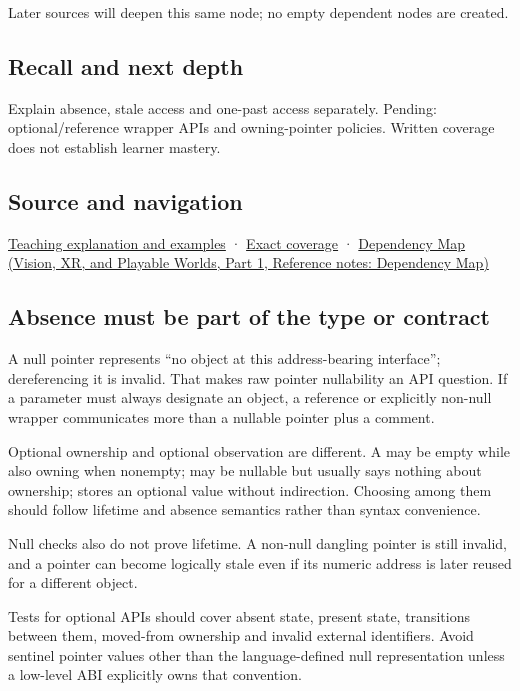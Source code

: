 Later sources will deepen this same node; no empty dependent nodes are created.

\subsection{Recall and next depth}\label{appendix-afae48c31800-recall-and-next-depth}

\hypertarget{appendix-afae48c31800-recall-and-next-depth}{}

Explain absence, stale access and one-past access separately. Pending: optional/reference wrapper APIs and owning-pointer policies. Written coverage does not establish learner mastery.

\subsection{Source and navigation}\label{appendix-afae48c31800-source-and-navigation}

\hypertarget{appendix-afae48c31800-source-and-navigation}{}

\hyperref[01-foundations-i-ch003-a-pointer-carries-an-access-contract]{Teaching explanation and examples} · \hyperref[appendix-fd090d982a15-m008---parts-113-126]{Exact coverage} · \href{../07-Vision-XR-and-Playable-Worlds-P01/main.pdf\#nameddest=appendix-4ad47bdd269a}{Dependency Map (Vision, XR, and Playable Worlds, Part 1, Reference notes: Dependency Map)}

\subsection{Absence must be part of the type or contract}\label{appendix-afae48c31800-absence-must-be-part-of-the-type-or-contract}

\hypertarget{appendix-afae48c31800-absence-must-be-part-of-the-type-or-contract}{}

A null pointer represents ``no object at this address-bearing interface''; dereferencing it is invalid. That makes raw pointer nullability an API question. If a parameter must always designate an object, a reference or explicitly non-null wrapper communicates more than a nullable pointer plus a comment.

Optional ownership and optional observation are different. A  may be empty while also owning when nonempty;  may be nullable but usually says nothing about ownership;  stores an optional value without indirection. Choosing among them should follow lifetime and absence semantics rather than syntax convenience.

Null checks also do not prove lifetime. A non-null dangling pointer is still invalid, and a pointer can become logically stale even if its numeric address is later reused for a different object.

Tests for optional APIs should cover absent state, present state, transitions between them, moved-from ownership and invalid external identifiers. Avoid sentinel pointer values other than the language-defined null representation unless a low-level ABI explicitly owns that convention.
